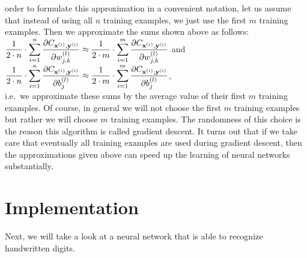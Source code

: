 order to formulate this approximation in a convenient notation, let us assume that instead of using all $n$
training examples, we just use the first $m$ training examples.  Then we approximate the sums shown above as follows:
\\[0.2cm]
\hspace*{1.3cm}
$\displaystyle \frac{1}{2\cdot n} \cdot \sum\limits_{i=1}^n \frac{\partial C_{\mathbf{x}^{(i)}, \mathbf{y}^{(i)}}}{\partial w_{j,k}^{(l)}}
 \approx
 \frac{1}{2\cdot m} \cdot \sum\limits_{i=1}^m \frac{\partial C_{\mathbf{x}^{(i)}, \mathbf{y}^{(i)}}}{\partial w_{j,k}^{(l)}}
$
\quad and \quad
$\displaystyle \frac{1}{2\cdot n} \cdot \sum\limits_{i=1}^n \frac{\partial C_{\mathbf{x}^{(i)}, \mathbf{y}^{(i)}}}{\partial b_{j}^{(l)}}
     \approx
     \frac{1}{2\cdot m} \cdot \sum\limits_{i=1}^m \frac{\partial C_{\mathbf{x}^{(i)}, \mathbf{y}^{(i)}}}{\partial b_{j}^{(l)}}
$,
\\[0.2cm]
i.e.~we approximate these sums by the average value of their first $m$ training examples.
Of course, in general we will not choose the first $m$ training examples but rather we will choose $m$ 
training examples.  The randomness of this choice is the reason this algorithm is called 
gradient descent.  It turns out that if we take care that eventually all training examples are used during
gradient descent, then the approximations given above can speed up the learning of neural networks substantially.

\section{Implementation}
Next, we will take a look at a neural network that is able to recognize handwritten digits. 

